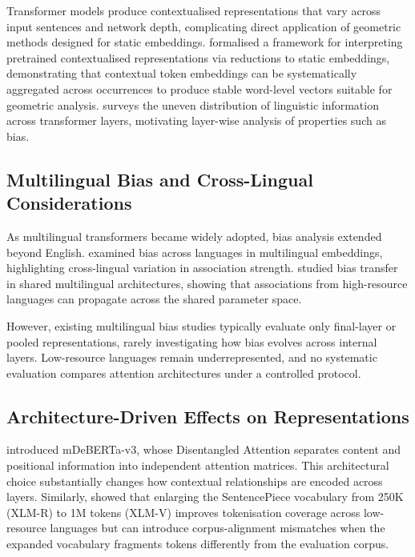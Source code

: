 \documentclass[10pt]{article}
\begin{document}
Transformer models produce contextualised representations that vary across
input sentences and network depth, complicating direct application of
geometric methods designed for static embeddings. \citet{bommasani2020reductions}
formalised a framework for interpreting pretrained contextualised representations
via reductions to static embeddings, demonstrating that contextual token
embeddings can be systematically aggregated across occurrences to produce stable
word-level vectors suitable for geometric analysis. \citet{rogers2020primer}
surveys the uneven distribution of linguistic information across transformer
layers, motivating layer-wise analysis of properties such as bias.

\subsection{Multilingual Bias and Cross-Lingual Considerations}

As multilingual transformers became widely adopted, bias analysis extended
beyond English. \citet{dev2019measuring} examined bias across languages in
multilingual embeddings, highlighting cross-lingual variation in association
strength. \citet{lauscher2020zero} studied bias transfer in shared multilingual
architectures, showing that associations from high-resource languages can
propagate across the shared parameter space.

However, existing multilingual bias studies typically evaluate only final-layer
or pooled representations, rarely investigating how bias evolves across internal
layers. Low-resource languages remain underrepresented, and no systematic
evaluation compares attention architectures under a controlled protocol.

\subsection{Architecture-Driven Effects on Representations}

\citet{he2021deberta} introduced mDeBERTa-v3, whose Disentangled Attention
separates content and positional information into independent attention matrices.
This architectural choice substantially changes how contextual relationships are
encoded across layers. Similarly, \citet{liang2023xlmv} showed that enlarging
the SentencePiece vocabulary from 250K (XLM-R) to 1M tokens (XLM-V) improves
tokenisation coverage across low-resource languages but can introduce
corpus-alignment mismatches when the expanded vocabulary fragments tokens
differently from the evaluation corpus.
\end{document}
